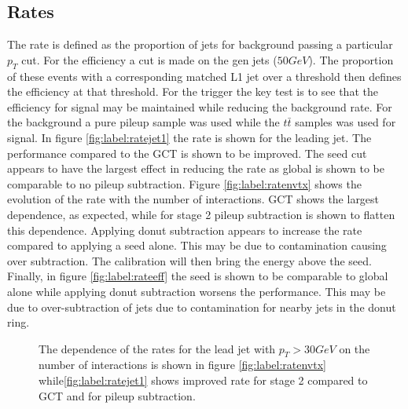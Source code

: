 \subsection{Rates}
The rate is defined as the proportion of jets for background passing a particular $p_{T}$ cut. For the efficiency a cut is made on the gen jets ($50GeV$). The proportion of these events with a corresponding matched L1 jet over a threshold then defines the efficiency at that threshold.  For the trigger the key test is to see that the efficiency for signal may be maintained while reducing the background rate. For the background a pure pileup sample was used while the $t\bar{t}$ samples was used for signal. In figure \ref{fig:label:ratejet1} the rate is shown for the leading jet. The performance compared to the GCT is shown to be improved. The seed cut appears to have the largest effect in reducing the rate as global is shown to be comparable to no pileup subtraction. Figure \ref{fig:label:ratenvtx} shows the evolution of the rate with the number of interactions. GCT shows the largest dependence, as expected, while for stage 2 pileup subtraction is shown to flatten this dependence. Applying donut subtraction appears to increase the rate compared to applying a seed alone. This may be due to contamination causing over subtraction. The calibration will then bring the energy above the seed. Finally, in figure \ref{fig:label:rateeff} the seed is shown to be comparable to global alone while applying donut subtraction worsens the performance. This may be due to over-subtraction of jets due to contamination for nearby jets in the donut ring.
\begin{figure}
\hfill
{}
\hfill
{}
\caption{The dependence of the rates for the lead jet with $p_T > 30 GeV$ on the number of interactions is shown in figure \ref{fig:label:ratenvtx} while\ref{fig:label:ratejet1} shows improved rate for stage 2 compared to GCT and for pileup subtraction.}
\label{fig:label:rates}
\end{figure}

